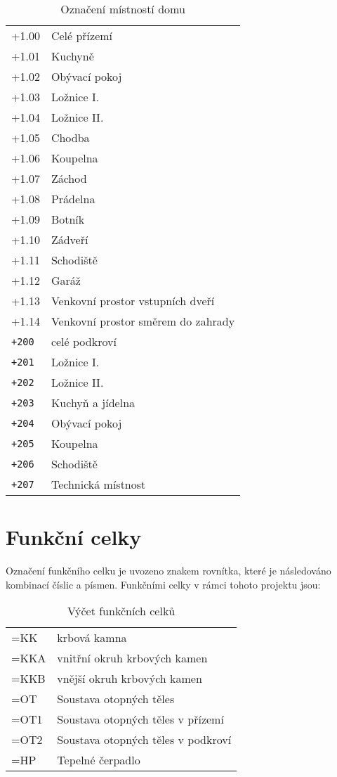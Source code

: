 \documentclass{book}
\begin{document}
  \begin{table}[]
    \centering
    \begin{tabular}{l l}
      +1.00 & Celé přízemí\\
      +1.01 & Kuchyně\\
      +1.02 & Obývací pokoj\\
      +1.03 & Ložnice I.\\
      +1.04 & Ložnice II.\\
      +1.05 & Chodba\\
      +1.06 & Koupelna\\
      +1.07 & Záchod\\
      +1.08 & Prádelna\\
      +1.09 & Botník\\
      +1.10 & Zádveří\\
      +1.11 & Schodiště\\
      +1.12 & Garáž\\
      +1.13 & Venkovní prostor vstupních dveří\\
      +1.14 & Venkovní prostor směrem do zahrady\\
      \texttt{+200} & celé podkroví\\
      \texttt{+201} & Ložnice I.\\
      \texttt{+202} & Ložnice II.\\
      \texttt{+203} & Kuchyň a jídelna\\
      \texttt{+204} & Obývací pokoj\\
      \texttt{+205} & Koupelna\\
      \texttt{+206} & Schodiště\\
      \texttt{+207} & Technická místnost
    \end{tabular}
    \caption{Označení místností domu}
    \label{tab:rooms}
  \end{table}

\section{Funkční celky}

    Označení funkčního celku je uvozeno znakem rovnítka, které je následováno
    kombinací číslic a písmen. Funkčními celky v rámci tohoto projektu jsou:

\begin{table}[]
  \centering
    \begin{tabular}{ l l}
    \textsf{=KK} & krbová kamna\\
    =KKA & vnitřní okruh krbových kamen\\
    =KKB & vnější okruh krbových kamen\\
    =OT & Soustava otopných těles\\
    \textsf{=OT1} & Soustava otopných těles v přízemí\\
    =OT2 & Soustava otopných těles v podkroví\\
    =HP & Tepelné čerpadlo\\
    \end{tabular}
  \caption{Výčet funkčních celků}
  \label{tab:funkcnicelky}
\end{table}
\end{document}
